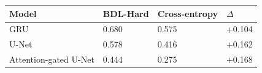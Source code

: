\begin{tabular}{llll}
\toprule
Model & BDL-Hard & Cross-entropy & $\Delta$ \\
\midrule
GRU & 0.680 & 0.575 & +0.104 \\
U-Net & 0.578 & 0.416 & +0.162 \\
Attention-gated U-Net & 0.444 & 0.275 & +0.168 \\
\bottomrule
\end{tabular}
